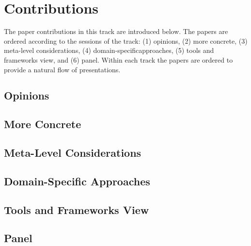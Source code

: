 

\section{Contributions}
\label{sec:contributions}

The paper contributions in this track are introduced below. The papers are ordered according to the sessions of the track: 
(1) opinions, 
(2) more concrete,
(3) meta-level considerations​,
(4) domain-specific ​approaches​,
(5) ​tools and frameworks view​, and 
(6) panel​​.
%
Within each track the papers are ordered to provide
a natural flow of presentations. 

\subsection{Opinions}





\subsection{More Concrete}





\subsection{Meta-Level Considerations}





\subsection{Domain-Specific ​Approaches}





\subsection{Tools and Frameworks View​}





\subsection{Panel}



